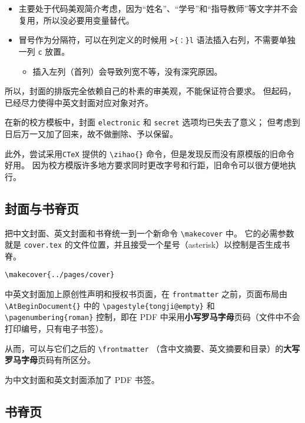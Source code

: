 \documentclass[../Main/thesis.tex]{subfiles}
\begin{document}
\begin{enumerate}
  \begin{itemize}
  \item
    主要处于代码美观简介考虑，因为``姓名''、``学号''和``指导教师''等文字并不会复用，所以没必要用变量替代。
  \item
    冒号作为分隔符，可以在列定义的时候用 \texttt{\textgreater{}\{：\}l}
    语法插入右列，不需要单独一列 \texttt{c} 放置。

    \begin{itemize}
    \item
      插入左列（首列）会导致列宽不等，没有深究原因。
    \end{itemize}
  \end{itemize}
\end{enumerate}

所以，封面的排版完全依赖自己的朴素的审美观，不能保证符合要求。
但起码，已经尽力使得中英文封面对应对象对齐。

在新的校方模板中，封面 \texttt{electronic} 和 \texttt{secret}
选项均已失去了意义； 但考虑到日后万一又加了回来，故不做删除、予以保留。

此外，尝试采用\texttt{CTeX} 提供的 \texttt{\textbackslash{}zihao\{\}}
命令，但是发现反而没有原模版的旧命令好用。
因为校方模版许多地方要求同时更改字号和行距，旧命令可以很方便地执行。

\subsection{封面与书脊页}

把中文封面、英文封面和书脊统一到一个新命令
\texttt{\textbackslash{}makecover} 中。 它的必需参数就是
\texttt{cover.tex}
的文件位置，并且接受一个星号（asterisk）以控制是否生成书脊。

\texttt{\textbackslash{}makecover\{../pages/cover\}}

中英文封面加上原创性声明和授权书页面，在 \texttt{frontmatter}
之前，页面布局由 \texttt{\textbackslash{}AtBeginDocument\{\}} 中的
\texttt{\textbackslash{}pagestyle\{tongji@empty\}} 和
\texttt{\textbackslash{}pagenumbering\{roman\}} 控制，即在 PDF
中采用\textbf{小写罗马字母}页码（文件中不会打印编号，只有电子书签）。

从而，可以与它们之后的 \texttt{\textbackslash{}frontmatter}
（含中文摘要、英文摘要和目录）的\textbf{大写罗马字母}页码有所区分。

为中文封面和英文封面添加了 PDF 书签。

\subsection{书脊页}
\end{document}
